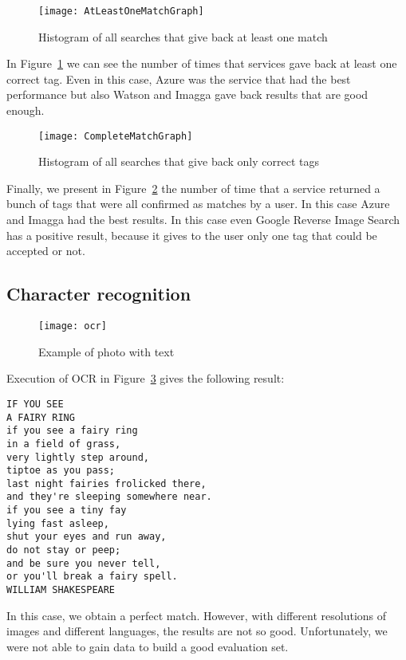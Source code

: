 \begin{figure}[H]
\centering
\texttt{[image: AtLeastOneMatchGraph]}
\caption{Histogram of all searches that give back at least one match}
\label{img:testatleastone}
\end{figure}

In Figure~\ref{img:testatleastone} we can see the number of times that services 
gave back at least one correct tag. Even in this case, Azure was the service 
that had the best performance but also Watson and Imagga gave back results that 
are good enough.

\begin{figure}[H]
\centering
\texttt{[image: CompleteMatchGraph]}
\caption{Histogram of all searches that give back only correct tags}
\label{img:testcompletematch}
\end{figure}

Finally, we present in Figure~\ref{img:testcompletematch} the number of time 
that a service returned a bunch of tags that were all confirmed as matches by a 
user. In this case Azure and Imagga had the best results. In this case even 
Google Reverse Image Search has a positive result, because it gives to the user 
only one tag that could be accepted or not.

\subsection{Character recognition}

\begin{figure}[H]
\centering
\texttt{[image: ocr]}
\caption{Example of photo with text}
\label{testOCR}
\end{figure}

Execution of OCR in Figure~\ref{testOCR} gives the following result:
\begin{lstlisting}
IF YOU SEE
A FAIRY RING
if you see a fairy ring
in a field of grass,
very lightly step around,
tiptoe as you pass;
last night fairies frolicked there,
and they're sleeping somewhere near.
if you see a tiny fay
lying fast asleep,
shut your eyes and run away,
do not stay or peep;
and be sure you never tell,
or you'll break a fairy spell.
WILLIAM SHAKESPEARE
\end{lstlisting}

In this case, we obtain a perfect match. However, with different resolutions of 
images and different languages, the results are not so good. Unfortunately, we 
were not able to gain data to build a good evaluation set.